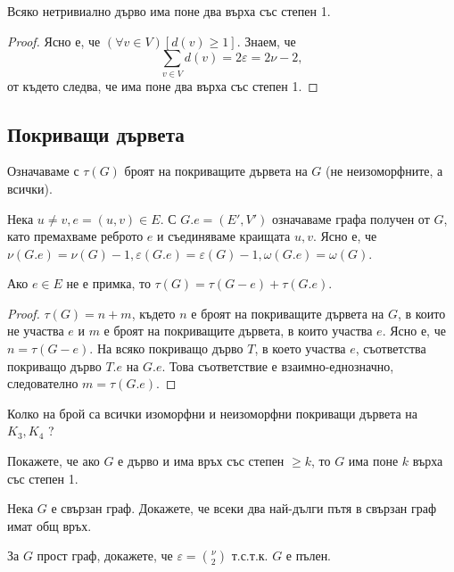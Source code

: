 \begin{crl}
  Всяко нетривиално дърво има поне два върха със степен 1.
\end{crl}
\begin{proof}
  Ясно е, че $(\forall v\in V)[d(v) \geq 1]$.
  Знаем, че \[\sum_{v\in V}d(v) = 2\varepsilon = 2\nu - 2,\] от където следва, че има поне два върха със степен 1.
\end{proof}

\subsection{Покриващи дървета}

Означаваме с $\tau(G)$ броят на покриващите дървета на $G$ (не неизоморфните, а всички).

Нека $u\neq v, e = (u,v)\in E$. С $G.e = (E',V')$ означаваме графа получен от $G$, като премахваме реброто $e$ и 
съединяваме краищата $u,v$. Ясно е, че $\nu(G.e) = \nu(G) - 1, \varepsilon(G.e) = \varepsilon(G) - 1, \omega(G.e) = \omega(G)$.

\begin{thm}
  Ако $e\in E$ не е примка, то
  $\tau(G) = \tau(G-e) + \tau(G.e)$.
\end{thm}
\begin{proof}
  $\tau(G) = n + m$, където $n$ е броят на покриващите дървета на $G$, в които не участва $e$
  и $m$ е броят на покриващите дървета, в които участва $e$.
  Ясно е, че $n = \tau(G-e)$.
  На всяко покриващо дърво $T$, в което участва $e$, съответства покриващо дърво $T.e$ на $G.e$.
  Това съответствие е взаимно-еднозначно, следователно $m = \tau(G.e)$.
\end{proof}

\begin{problem}
  Колко на брой са всички изоморфни и неизоморфни покриващи дървета на $K_3,K_4$ ?
\end{problem}


\begin{problem}
  Покажете, че ако $G$ е дърво и има връх със степен $\geq k$, то $G$ има поне $k$ върха със степен 1.
\end{problem}

\begin{problem}
  Нека $G$ е свързан граф.
  Докажете, че всеки два най-дълги пътя в свързан граф имат общ връх.
\end{problem}

\begin{problem}
  За $G$ прост граф, докажете, че $\varepsilon = \binom{\nu}{2}$ т.с.т.к. $G$ е пълен.
\end{problem}

